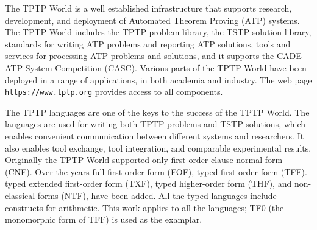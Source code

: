 \documentclass[letterpaper]{article}
\newcommand{\smalltt}[1]{\small \texttt{#1}}
\begin{document}
The TPTP World \cite{Sut17} is a well established infrastructure that supports research, 
development, and deployment of Automated Theorem Proving (ATP) systems.
The TPTP World includes the TPTP problem library,
the TSTP solution library,
standards for writing ATP problems and reporting ATP solutions,
tools and services for processing ATP problems and solutions,
and it supports the CADE ATP System Competition (CASC).
Various parts of the TPTP World have been deployed in a range of applications,
in both academia and industry.
The web page \smalltt{https://www.tptp.org} provides access to all components.

The TPTP languages \cite{Sut22-IGPL} are one of the keys to the success of the TPTP World.
The languages are used for writing both TPTP problems and TSTP solutions, which enables convenient 
communication between different systems and researchers. 
It also enables tool exchange, tool integration, and comparable experimental results.
Originally the TPTP World supported only first-order clause normal form (CNF).
Over the years full first-order form (FOF),
typed first-order form (TFF).
typed extended first-order form (TXF),
typed higher-order form (THF),
and non-classical forms (NTF),
have been added.
All the typed languages include constructs for arithmetic.
This work applies to all the languages; TF0 (the monomorphic form of TFF) \cite{SS+12} 
is used as the examplar.
\end{document}
